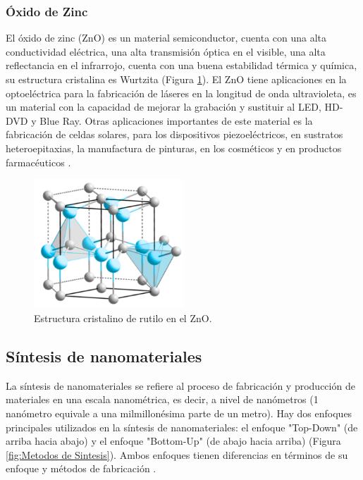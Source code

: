 \documentclass[12pt]{article}
\begin{document}
    \subsubsection{Óxido de Zinc}
    El óxido de zinc (ZnO) es un material semiconductor, cuenta con una alta conductividad eléctrica, una alta transmisión óptica en el visible, una alta reflectancia en el infrarrojo, cuenta con una buena estabilidad térmica y química, su estructura cristalina es Wurtzita (Figura \ref{fig:ZnO_Cristal}). El ZnO tiene aplicaciones en la optoeléctrica para la fabricación de láseres en la longitud de onda ultravioleta, es un material con la capacidad de mejorar la grabación y sustituir al LED, HD-DVD y Blue Ray. Otras aplicaciones importantes de este material es la fabricación de celdas solares, para los dispositivos piezoeléctricos, en sustratos heteroepitaxias, la manufactura de pinturas, en los cosméticos y en productos farmacéuticos \cite{IEEEreferencias:Ref13,IEEEreferencias:ZnO1, IEEEreferencias:ZnO2, IEEEreferencias:ZnO3,IEEEreferencias:ZnO4, IEEEreferencias:ZnO5,IEEEreferencias:ZnO6, IEEEreferencias:ZnO7, IEEEreferencias:ZnO8,IEEEreferencias:ZnO9, IEEEreferencias:ZnO10, IEEEreferencias:ZnOGO_Fotocatalisis_2,IEEEreferencias:ZnOGO_Fotocatalisis_3,IEEEreferencias:ZnOGO_Fotocatalisis_4, IEEEreferencias:ZnOGO_Fotocatalisis_5, IEEEreferencias:ZnOGO_Fotocatalisis_6, IEEEreferencias:ZnOGO_Fotocatalisis_7}.
    
        \begin{figure}[H]
    	   \begin{center}
     	  	\includegraphics[width = 0.5\textwidth]{Imagenes/ZnO_Cristal.png}
     	  	\caption{Estructura cristalino de rutilo en el ZnO.}\label{fig:ZnO_Cristal}  
    	   \end{center} 
        \end{figure}
     

    
    \subsection{Síntesis de nanomateriales}
    La síntesis de nanomateriales se refiere al proceso de fabricación y producción de materiales en una escala nanométrica, es decir, a nivel de nanómetros (1 nanómetro equivale a una milmillonésima parte de un metro). Hay dos enfoques principales utilizados en la síntesis de nanomateriales: el enfoque "Top-Down" (de arriba hacia abajo) y el enfoque "Bottom-Up" (de abajo hacia arriba) (Figura \ref{fig:Metodos de Sintesis}). Ambos enfoques tienen diferencias en términos de su enfoque y métodos de fabricación \cite{IEEEreferencias:TOPDOWN_BOTTOMUP}.
\end{document}

